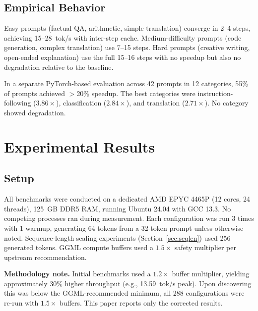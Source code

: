 \documentclass[11pt]{article}
\begin{document}
\subsection{Empirical Behavior}


Easy prompts (factual QA, arithmetic, simple translation) converge in 2--4 steps,
achieving 15--28~tok/s with inter-step cache. Medium-difficulty prompts (code generation,
complex translation) use 7--15 steps. Hard prompts (creative writing, open-ended
explanation) use the full 15--16 steps with no speedup but also no degradation relative
to the baseline.

In a separate PyTorch-based evaluation across 42 prompts in 12 categories, 55\% of
prompts achieved $>$20\% speedup. The best categories were instruction-following
($3.86\times$), classification ($2.84\times$), and translation ($2.71\times$). No
category showed degradation.


\section{Experimental Results}

\subsection{Setup}

All benchmarks were conducted on a dedicated AMD EPYC 4465P (12 cores, 24 threads),
125~GB DDR5 RAM, running Ubuntu 24.04 with GCC 13.3. No competing processes ran during
measurement. Each configuration was run 3 times with 1 warmup, generating 64 tokens from
a 32-token prompt unless otherwise noted. Sequence-length scaling experiments
(Section~\ref{sec:seqlen}) used 256 generated tokens. GGML compute buffers used a
$1.5\times$ safety multiplier per upstream recommendation.

\textbf{Methodology note.} Initial benchmarks used a $1.2\times$ buffer multiplier,
yielding approximately 30\% higher throughput (e.g., 13.59~tok/s peak). Upon discovering
this was below the GGML-recommended minimum, all 288 configurations were re-run with
$1.5\times$ buffers. This paper reports only the corrected results.
\end{document}
